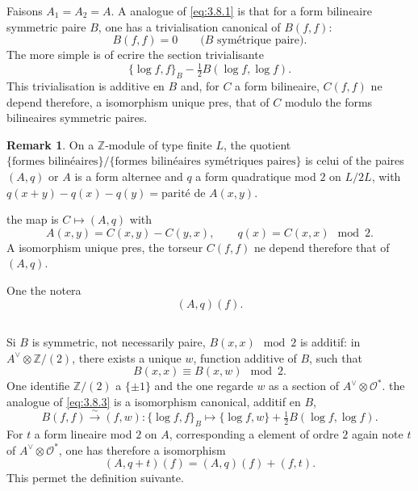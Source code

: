 \documentclass[12pt,a4paper]{article}
\theoremstyle{plain}
\theoremstyle{definition}
\newtheorem{remark}[theorem]{Remark}
\theoremstyle{remark}
\newcommand{\cO}{\mathcal{O}}
\newcommand{\Z}{\mathbb{Z}}
\providecommand{\cO}{\mathcal{O}}
\begin{document}
Faisons $A_1 = A_2 = A$. A analogue of \eqref{eq:3.8.1} is that for a form bilineaire
symmetric paire $B$, one has a trivialisation canonical of $B(f,f)$:
\begin{equation}\label{eq:3.10.3}
B(f,f) = 0 \qquad \text{($B$ symétrique paire)}.
\end{equation}
The more simple is of ecrire the section trivialisante
\begin{equation}\label{eq:3.10.4}
\{\log f, f\}_B - \tfrac{1}{2} B(\log f, \log f).
\end{equation}
This trivialisation is additive en $B$ and, for $C$ a form bilineaire, $C(f,f)$ ne
depend therefore, a isomorphism unique pres, that of $C$ modulo the forms bilineaires symmetric paires.

\begin{remark}
On a $\Z$-module of type finite $L$, the quotient $\{\text{formes bilinéaires}\}/\{\text{formes bilinéaires symétriques paires}\}$ is celui of the paires $(A, q)$ or $A$ is a form alternee and $q$ a form
quadratique mod $2$ on $L/2L$, with $q(x+y) - q(x) - q(y) = \text{parité de } A(x,y)$.

the map is $C \mapsto (A, q)$ with
\[
A(x,y) = C(x,y) - C(y,x), \qquad q(x) = C(x,x) \mod 2.
\]
A isomorphism unique pres, the torseur $C(f,f)$ ne depend therefore that of $(A, q)$.

One the notera
\[
(A, q)(f).
\]
\end{remark}

\subsection{}

Si $B$ is symmetric, not necessarily paire, $B(x,x) \mod 2$ is additif:
in $A^\vee \otimes \Z/(2)$, there exists a unique $w$, function additive of $B$, such that
\[
B(x,x) \equiv B(x, w) \mod 2.
\]
One identifie $\Z/(2)$ a $\{\pm 1\}$ and the one regarde $w$ as a section of $A^\vee \otimes \cO^*$. the analogue
of \eqref{eq:3.8.3} is a isomorphism canonical, additif en $B$,
\begin{equation}\label{eq:3.11.1}
B(f,f) \xrightarrow{\sim} (f, w) : \{\log f, f\}_B \mapsto \{\log f, w\} + \tfrac{1}{2} B(\log f, \log f).
\end{equation}
For $t$ a form lineaire mod $2$ on $A$, corresponding a element of ordre $2$ again
note $t$ of $A^\vee \otimes \cO^*$, one has therefore a isomorphism
\[
(A, q + t)(f) = (A, q)(f) + (f, t).
\]
This permet the definition suivante.
\end{document}
